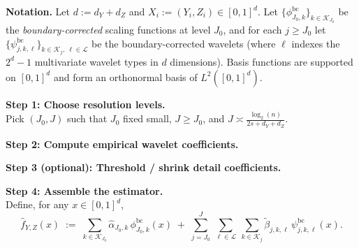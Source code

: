 \documentclass{article}
\theoremstyle{plain}
\theoremstyle{definition}
\theoremstyle{plain}
\begin{document}
\begin{algorithm}[tbp]

\BlankLine
\textbf{Notation.}
Let $d := d_Y + d_Z$ and $X_i := (Y_i,Z_i)\in[0,1]^d$.
Let $\{\phi_{J_0,k}^{\mathrm{bc}}\}_{k\in\mathcal K_{J_0}}$ be the \emph{boundary-corrected} scaling functions at level $J_0$,
and for each $j\ge J_0$ let $\{\psi_{j,k,\ell}^{\mathrm{bc}}\}_{k\in\mathcal K_j,\ \ell\in\mathcal L}$ be the boundary-corrected wavelets
(where $\ell$ indexes the $2^d-1$ multivariate wavelet types in $d$ dimensions).
Basis functions are supported on $[0,1]^d$ and form an orthonormal basis of $L^2([0,1]^d)$.

\BlankLine
\textbf{Step 1: Choose resolution levels.}\\
Pick $(J_0,J)$ such that $J_0$ fixed small, $J \geq J_0$, and $J \asymp \frac{\log_2(n)}{2s + d_Y + d_Z}$.

\BlankLine
\textbf{Step 2: Compute empirical wavelet coefficients.}\\

\BlankLine
\textbf{Step 3 (optional): Threshold / shrink detail coefficients.}\\

\BlankLine
\textbf{Step 4: Assemble the estimator.}\\
Define, for any $x\in[0,1]^d$,
\[
\widehat f_{Y,Z}(x)
\;:=\;
\sum_{k\in\mathcal K_{J_0}}\widehat\alpha_{J_0,k}\,\phi_{J_0,k}^{\mathrm{bc}}(x)
\;+\;
\sum_{j=J_0}^{J}\ \sum_{\ell\in\mathcal L}\ \sum_{k\in\mathcal K_j}
\widetilde\beta_{j,k,\ell}\,\psi_{j,k,\ell}^{\mathrm{bc}}(x).
\]


\end{algorithm}
\end{document}
